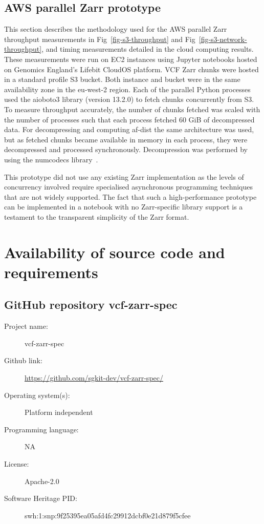 \documentclass[a4paper,num-refs]{oup-contemporary}
\begin{document}
\subsection{AWS parallel Zarr prototype}
This section describes the methodology used for the AWS parallel Zarr
throughput measurements in Fig~\ref{fig-s3-throughput}
and Fig~\ref{fig-s3-network-throughput}, and timing measurements
detailed in the cloud computing results.
These measurements were run on EC2 instances using Jupyter notebooks
hosted on Genomics England's Lifebit CloudOS platform. VCF Zarr chunks
were hosted in a standard profile S3 bucket. Both instance and bucket were
in the same availability zone in the eu-west-2 region. Each
of the parallel Python processes used the aioboto3 library (version 13.2.0) to
fetch chunks concurrently from S3. To measure throughput accurately, the
number of chunks fetched was scaled with the number of processes such that
each process fetched 60 GiB of decompressed data.
For decompressing
and computing af-dist the same architecture was used, but as fetched chunks
became available in memory in each process, they were decompressed and
processed synchronously. Decompression was performed by using the 
numcodecs library~\citep{numcodecs}.

This prototype did not use any existing Zarr implementation as 
the levels of concurrency involved require specialised 
asynchronous programming techniques that are not widely supported.
The fact that such a high-performance prototype can be implemented
in a notebook with no Zarr-specific library support is a testament to the 
transparent simplicity of the Zarr format.

\section{Availability of source code and requirements}
\subsection{GitHub repository vcf-zarr-spec}
\begin{description}
\item[Project name:]  vcf-zarr-spec
\item[Github link:] \url{https://github.com/sgkit-dev/vcf-zarr-spec/}
\item[Operating system(s):] Platform independent
\item[Programming language:] NA
\item[License:] Apache-2.0
\item[Software Heritage PID:]
swh:1:snp:9f25395ea05afd4fc29912dcbf0e21d879f5cfee \cite{vcfzarr-spec-swh}
\end{description}
\end{document}
